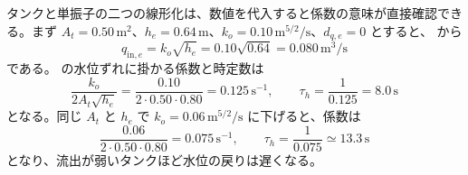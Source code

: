タンクと単振子の二つの線形化は、数値を代入すると係数の意味が直接確認できる。まず $A_t=0.50\,\mathrm{m^2}$、$h_e=0.64\,\mathrm{m}$、$k_o=0.10\,\mathrm{m^{5/2}/s}$、$d_{q,e}=0$ とすると、 から
\begin{equation}
  q_{\mathrm{in},e}=k_o\sqrt{h_e}
  =0.10\sqrt{0.64}
  =0.080\,\mathrm{m^3/s}
\end{equation}
である。 の水位ずれに掛かる係数と時定数は
\begin{equation}
  \frac{k_o}{2A_t\sqrt{h_e}}
  =\frac{0.10}{2\cdot0.50\cdot0.80}
  =0.125\,\mathrm{s^{-1}},
  \qquad
  \tau_h=\frac{1}{0.125}=8.0\,\mathrm{s}
\end{equation}
となる。同じ $A_t$ と $h_e$ で $k_o=0.06\,\mathrm{m^{5/2}/s}$ に下げると、係数は
\begin{equation}
  \frac{0.06}{2\cdot0.50\cdot0.80}
  =0.075\,\mathrm{s^{-1}},
  \qquad
  \tau_h=\frac{1}{0.075}\simeq13.3\,\mathrm{s}
\end{equation}
となり、流出が弱いタンクほど水位の戻りは遅くなる。

